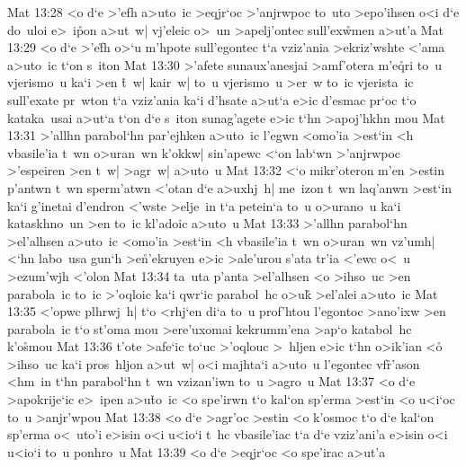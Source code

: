 \vs Mat 13:28
<o
d`e
>'efh
a>uto~ic
>eqjr`oc
>'anjrwpoc
to~uto
>epo'ihsen
o<i
d`e
do~uloi
e>~i\r{p}on
a>ut~w|
vj'eleic
o>~un
>apelj'ontec
sull'ex\r{w}men
a>ut'a\bibvsend
\vs Mat 13:29
<o
d`e
>'e\r{f}h
o>`u
m'hpote
sull'egontec
t`a
vziz'ania
>ekriz'wshte
<'ama
a>uto~ic
t`on
s~iton\bibvsend
\vs Mat 13:30
>'afete
sunaux'anesjai
>amf'otera
m'e\r{q}ri
to~u
vjerismo~u
ka`i
>en
\r{t}~w|
kair~w|
to~u
vjerismo~u
>er~w
to~ic
vjerista~ic
sull'exate
pr~wton
t`a
vziz'ania
ka`i
d'hsate
a>ut`a
e>ic
d'esmac
pr`oc
t`o
kataka~usai
a>ut`a
t`on
d`e
s~iton
sunag'agete
e>ic
t`hn
>apoj'hkhn
mou\bibvsend
\vs Mat 13:31
>'allhn
parabol`hn
par'ejhken
a>uto~ic
l'egwn
<omo'ia
>est`in
<h
vbasile'ia
t~wn
o>uran~wn
k'okkw|
sin'apewc
<`on
lab`wn
>'anjrwpoc
>'espeiren
>en
t~w|
>agr~w|
a>uto~u\bibvsend
\vs Mat 13:32
<`o
mikr'oteron
m'en
>estin
p'antwn
t~wn
sperm'atwn
<'otan
d`e
a>uxhj~h|
me~izon
t~wn
laq'anwn
>est`in
ka`i
g'inetai
d'endron
<'wste
>elje~in
t`a
petein`a
to~u
o>urano~u
ka`i
kataskhno~un
>en
to~ic
kl'adoic
a>uto~u\bibvsend
\vs Mat 13:33
>'allhn
parabol`hn
>el'alhsen
a>uto~ic
<omo'ia
>est`in
<h
vbasile'ia
t~wn
o>uran~wn
vz'umh|
<`hn
labo~usa
gun`h
>e\r{n}'ekruyen
e>ic
>ale'urou
s'ata
tr'ia
<'ewc
o<~u
>ezum'wjh
<'olon\bibvsend
\vs Mat 13:34
ta~uta
p'anta
>el'alhsen
<o
>ihso~uc
>en
parabola~ic
to~ic
>'oqloic
ka`i
qwr`ic
parabol~hc
o>u\r{k}
>el'alei
a>uto~ic\bibvsend
\vs Mat 13:35
<'opwc
plhrwj~h|
t`o
<rhj`en
di`a
to~u
prof'htou
l'egontoc
>ano'ixw
>en
parabola~ic
t`o
st'oma
mou
>ere'uxomai
kekrumm'ena
>ap`o
katabol~hc
k'o\r{s}mou\bibvsend
{}
\vs Mat 13:36
t'ote
>afe`ic
to`uc
>'oqlouc
>~hljen
e>ic
t`hn
o>ik'ian
<o\r{}
>ihso~uc
ka`i
pros~hljon
a>ut~w|
o<i
majhta`i
a>uto~u
l'egontec
vf\r{r}'ason
<hm~in
t`hn
parabol`hn
t~wn
vzizan'iwn
to~u
>agro~u\bibvsend
\vs Mat 13:37
<o
d`e
>apokrije`ic
e>~ipen
a>u\r{t}o~ic
<o
spe'irwn
t`o
kal`on
sp'erma
>est`in
<o
u<i`oc
to~u
>anjr'wpou\bibvsend
\vs Mat 13:38
<o
d`e
>agr'oc
>estin
<o
k'osmoc
t`o
d`e
kal`on
sp'erma
o<~uto'i
e>isin
o<i
u<io`i
t~hc
vbasile'iac
t`a
d`e
vziz'ani'a
e>isin
o<i
u<io`i
to~u
ponhro~u\bibvsend
\vs Mat 13:39
<o
d`e
>eqjr`oc
<o
spe'irac
a>ut'a
